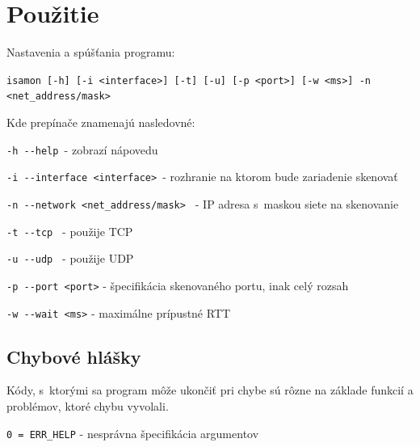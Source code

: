 \chapter{Použitie}
Nastavenia a spúšťania programu: 

\texttt{isamon [-h] [-i <interface>] [-t] [-u] [-p <port>] [-w <ms>] -n <net\_address/mask> }

Kde prepínače znamenajú nasledovné: 

\texttt{\hspace{5mm}-h \hspace{5mm}-{}-help \hspace{3mm}}- zobrazí nápovedu

\texttt{\hspace{5mm}-i \hspace{5mm}-{}-interface <interface> \hspace{3mm}}- rozhranie na ktorom bude zariadenie skenovať

\texttt{\hspace{5mm}-n \hspace{5mm}-{}-network <net\_address/mask> \hspace{3mm}} - IP adresa s~maskou siete na skenovanie

\texttt{\hspace{5mm}-t \hspace{5mm}-{}-tcp \hspace{3mm}} - použije TCP

\texttt{\hspace{5mm}-u \hspace{5mm}-{}-udp \hspace{3mm}} - použije UDP

\texttt{\hspace{5mm}-p \hspace{5mm}-{}-port <port>\hspace{3mm}} - špecifikácia skenovaného portu, inak celý rozsah

\texttt{\hspace{5mm}-w \hspace{5mm}-{}-wait <ms>\hspace{3mm}} - maximálne prípustné RTT

\section{Chybové hlášky}
Kódy, s~ktorými sa program môže ukončiť pri chybe sú rôzne na základe funkcií a problémov, ktoré chybu vyvolali.

\texttt{0 = ERR\_HELP} - nesprávna špecifikácia argumentov

